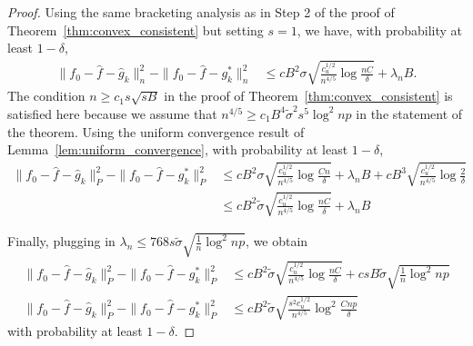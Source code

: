 \documentclass[12pt,pdftex,aos,noinfoline,addressasfootnote]{imsart}
\begin{document}
\begin{proof}
Using the same bracketing analysis as in Step 2 of the proof of Theorem~\ref{thm:convex_consistent} but setting $s=1$, we have, with probability at least $1-\delta$,
\begin{align*}
\| f_0 - \hat{f} - \hat{g}_k \|_n^2 - \|f_0 - \hat{f} - g^*_k \|_n^2 &\leq
  c B^2 \sigma \sqrt{ \frac{c_u^{1/2}}{n^{4/5}} \log \frac{nC}{\delta} }+ \lambda_n B.
\end{align*}
The condition $n \geq c_1 s\sqrt{sB}$ in the proof of Theorem~\ref{thm:convex_consistent} is satisfied here because we assume that $n^{4/5} \geq c_1 B^4 \tilde{\sigma}^2 s^5 \log^2 np$ in the statement of the theorem.
Using the uniform convergence result of Lemma~\ref{lem:uniform_convergence}, with probability at least $1-\delta$,
\begin{align*}
\| f_0 - \hat{f} - \hat{g}_k \|_P^2 - \|f_0 - \hat{f} - g^*_k \|_P^2 &\leq
  c B^2 \sigma \sqrt{ \frac{c_u^{1/2}}{n^{4/5}} \log \frac{Cn}{\delta} }+ \lambda_n B +
  c B^3 \sqrt{\frac{c_u^{1/2}}{n^{4/5}} \log \frac{2}{\delta} } \\
 &\leq c B^2 \tilde{\sigma} \sqrt{\frac{c_u^{1/2}}{n^{4/5}} \log \frac{nC}{\delta}}+ \lambda_n B
\end{align*}

Finally, plugging in $\lambda_n \leq 768 s \tilde{\sigma} \sqrt{
  \frac{1}{n} \log^2 np}$, we obtain
\begin{align*}
\| f_0 - \hat{f} - \hat{g}_k \|_P^2 - \|f_0 - \hat{f} - g^*_k \|_P^2 &
\leq c B^2 \tilde{\sigma} \sqrt{\frac{c_u^{1/2}}{n^{4/5}} \log \frac{nC}{\delta}}+ 
    c s B \tilde{\sigma} \sqrt{\frac{1}{n} \log^2 np}\\
\| f_0 - \hat{f} - \hat{g}_k \|_P^2 - \|f_0 - \hat{f} - g^*_k \|_P^2 &
\leq c B^2 \tilde{\sigma} \sqrt{\frac{s^2 c_u^{1/2}}{n^{4/5}} \log^2 \frac{Cnp}{\delta}}
\end{align*}
with probability at least $1-\delta$.


\end{proof}
\end{document}
